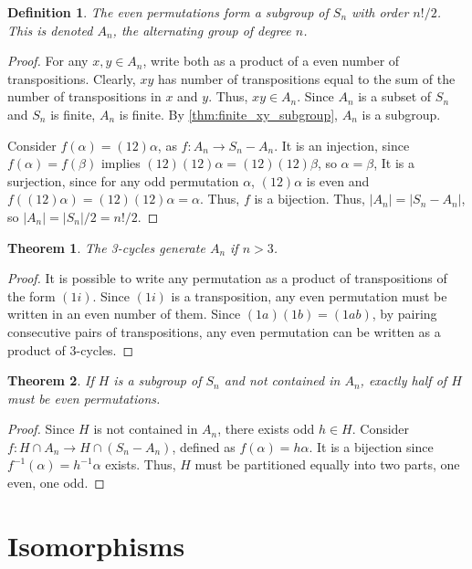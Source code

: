\documentclass{article}
\newtheorem{theorem}{Theorem}[section]
\newtheorem{definition}{Definition}[section]
\begin{document}
\begin{definition}
    The even permutations form a subgroup of $S_n$ with order $n!/2$.
    This is denoted $A_n$, the alternating group of degree $n$.
\end{definition}
\begin{proof}
    For any $x,y \in A_n$, write both as a product of a even number of transpositions.
    Clearly, $xy$ has number of transpositions equal to the sum of the number of transpositions in $x$ and $y$.
    Thus, $xy \in A_n$. Since $A_n$ is a subset of $S_n$ and $S_n$ is finite, $A_n$ is finite.
    By \autoref{thm:finite_xy_subgroup}, $A_n$ is a subgroup.

    Consider $f(\alpha) = (12)\alpha$, as $f:A_n \to S_n - A_n$.
    It is an injection, since $f(\alpha) = f(\beta)$ implies $(12)(12)\alpha = (12)(12)\beta$, so $\alpha = \beta$,
    It is a surjection, since for any odd permutation $\alpha$, $(12)\alpha$ is even and
    $f((12)\alpha) = (12)(12)\alpha = \alpha$.
    Thus, $f$ is a bijection. Thus, $|A_n| = |S_n - A_n|$, so $|A_n| = |S_n|/2 = n!/2$.
\end{proof}

\begin{theorem}
    The 3-cycles generate $A_n$ if $n > 3$.
\end{theorem}
\begin{proof}
    It is possible to write any permutation as a product of transpositions of the form $(1i)$.
    Since $(1i)$ is a transposition, any even permutation must be written in an even number of them.
    Since $(1a)(1b) = (1ab)$, by pairing consecutive pairs of transpositions, 
    any even permutation can be written as a product of 3-cycles.
\end{proof}

\begin{theorem}
    If $H$ is a subgroup of $S_n$ and not contained in $A_n$,
    exactly half of $H$ must be even permutations.
\end{theorem}
\begin{proof}
    Since $H$ is not contained in $A_n$, there exists odd $h \in H$.
    Consider $f : H \cap A_n \to H \cap (S_n - A_n)$, defined as $f(\alpha) = h\alpha$.
    It is a bijection since $f^{-1}(\alpha) = h^{-1}\alpha$ exists.
    Thus, $H$ must be partitioned equally into two parts, one even, one odd.
\end{proof}

\section{Isomorphisms}
\end{document}
